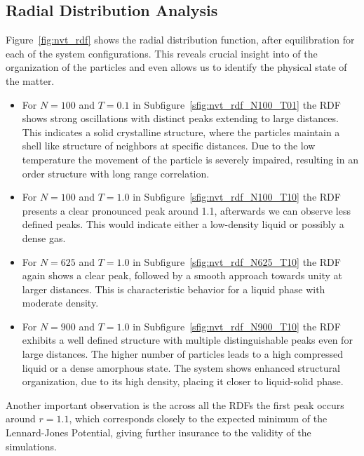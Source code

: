 \subsection{Radial Distribution Analysis}
Figure~\ref{fig:nvt_rdf} shows the radial distribution function, after equilibration for each of the system configurations. This reveals crucial insight into of the organization of the particles and even allows us to identify the physical state of the matter.
\begin{itemize}
	\item For $N=100$ and $T=0.1$ in Subfigure~\ref{sfig:nvt_rdf_N100_T01} the RDF shows strong oscillations with distinct peaks extending to large distances. This indicates a solid crystalline structure, where the particles maintain a shell like structure of neighbors at specific distances. Due to the low temperature the movement of the particle is severely impaired, resulting in an order structure with long range correlation.
	\item For $N=100$ and $T=1.0$ in Subfigure~\ref{sfig:nvt_rdf_N100_T10} the RDF presents a clear pronounced peak around 1.1, afterwards we can observe less defined peaks. This would indicate either a low-density liquid or possibly a dense gas.
	\item For $N=625$ and $T=1.0$ in Subfigure~\ref{sfig:nvt_rdf_N625_T10} the RDF again shows a clear peak, followed by a smooth approach towards unity at larger distances. This is characteristic behavior for a liquid phase with moderate density.
	\item For $N=900$ and $T=1.0$ in Subfigure~\ref{sfig:nvt_rdf_N900_T10} the RDF exhibits a well defined structure with multiple distinguishable peaks even for large distances. The higher number of particles leads to a high compressed liquid or a dense amorphous state. The system shows enhanced structural organization, due to its high density, placing it closer to liquid-solid phase.
\end{itemize}
Another important observation is the across all the RDFs the first peak occurs around $r=1.1$, which corresponds closely to the expected minimum of the Lennard-Jones Potential, giving further insurance to the validity of the simulations.
